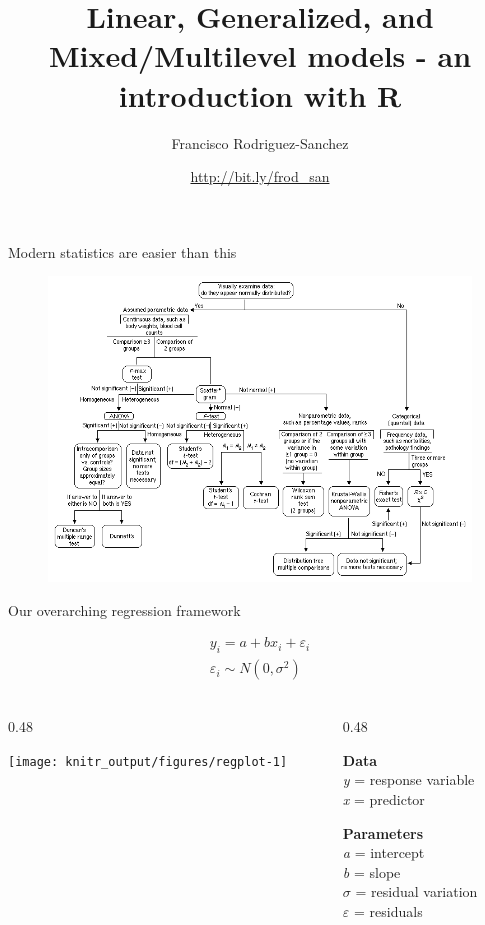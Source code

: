 \documentclass[10pt,ignorenonframetext,]{beamer}
\title{Linear, Generalized, and Mixed/Multilevel models - an introduction with
R}
\author{Francisco Rodriguez-Sanchez}
\date{\url{http://bit.ly/frod_san}}
\def\begincols{\begin{columns}[c]}
\def\endcols{\end{columns}}
\def\begincol{\begin{column}{0.48\textwidth}}
\def\endcol{\end{column}}
\begin{document}
\frame{\titlepage}

\begin{frame}{Modern statistics are easier than this}

\begin{figure}[htbp]
\centering
\includegraphics{images/tests_diagram.png}
\caption{}
\end{figure}

\end{frame}

\begin{frame}{Our overarching regression framework}

\[
  \begin{aligned}  
  y_{i}=a+bx_{i}+\varepsilon _{i} \\  
  \varepsilon _{i}\sim N\left( 0,\sigma^2 \right) \\  
  \end{aligned}  
\]

\begincols

\begincol

\begin{flushleft}\texttt{[image: knitr\_output/figures/regplot-1]} \end{flushleft}

\endcol

\begincol

\textbf{Data}\\
\emph{y} = response variable\\
\emph{x} = predictor

\textbf{Parameters}\\
\emph{a} = intercept\\
\emph{b} = slope\\
\(\sigma\) = residual variation\\
\(\varepsilon\) = residuals

\endcol
\endcols

\end{frame}
\end{document}
